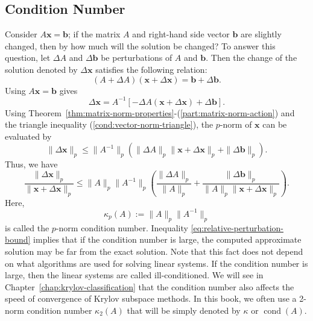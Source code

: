 \subsection{{Condition Number}}\label{sec:condition-number}
{Consider $A\bm x=\bm b$; if the matrix $A$ and right-hand side vector $\bm b$ are slightly changed, then by how much will the solution be changed? To answer this question, let $\Delta A$ and $\Delta\bm b$ be perturbations of $A$ and $\bm b$. Then the change of the solution denoted by $\Delta\bm x$ satisfies the following relation:}
\[
(A+\Delta A)(\bm x+\Delta\bm x)=\bm b+\Delta\bm b.
\]
{Using $A\bm x=\bm b$ gives}
\[
\Delta\bm x=A^{-1}[-\Delta A(\bm x+\Delta\bm x)+\Delta\bm b].
\]
{Using Theorem~\ref{thm:matrix-norm-properties}-(\ref{part:matrix-norm-action}) and the triangle inequality (\ref{cond:vector-norm-triangle}), the $p$-norm of $\bm x$ can be evaluated by}
\[
\|\Delta\bm x\|_p\le\|A^{-1}\|_p(\|\Delta A\|_p\|\bm x+\Delta\bm x\|_p+\|\Delta\bm b\|_p).
\]
{Thus, we have}
\begin{equation}\label{eq:relative-perturbation-bound}
\frac{\|\Delta\bm x\|_p}{\|\bm x+\Delta\bm x\|_p}
\le\|A\|_p\|A^{-1}\|_p
\left(\frac{\|\Delta A\|_p}{\|A\|_p}+
\frac{\|\Delta\bm b\|_p}{\|A\|_p\|\bm x+\Delta\bm x\|_p}\right).
\end{equation}
{Here,}
\begin{equation}\label{eq:p-norm-condition-number}
\kappa_p(A):=\|A\|_p\|A^{-1}\|_p
\end{equation}
{is called the $p$-norm condition number. Inequality \eqref{eq:relative-perturbation-bound} implies that if the condition number is large, the computed approximate solution may be far from the exact solution. Note that this fact does not depend on what algorithms are used for solving linear systems.}
{If the condition number is large, then the linear systems are called ill-conditioned. We will see in Chapter~\ref{chap:krylov-classification} that the condition number also affects the speed of convergence of Krylov subspace methods.}
{In this book, we often use a 2-norm condition number $\kappa_2(A)$ that will be simply denoted by $\kappa$ or $\operatorname{cond}(A)$.}
